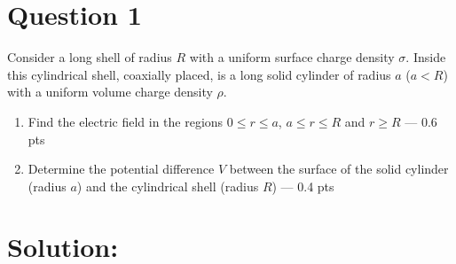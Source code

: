 \section*{Question 1}
Consider a long shell of radius $R$ with a uniform surface charge density $\sigma$. Inside this cylindrical shell, coaxially placed, is a long solid cylinder of radius $a$ ($a<R$) with a uniform volume charge density $\rho$. 
\begin{enumerate}
    \item[(a)] Find the electric field in the regions $ 0 \leqslant r \leq a$, $ a \leqslant r \leq R$ and $r \geqslant R$ --- 0.6 pts
    \item[(b)] Determine the potential difference $V$ between the surface of the solid cylinder (radius $a$) and the cylindrical shell (radius $R$) --- 0.4 pts
\end{enumerate}
\section*{Solution:}

